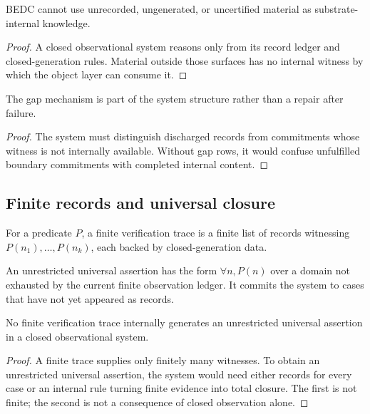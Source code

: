\begin{corollary}
\label{cor:philosophy-knowledge-comes-from-records}
BEDC cannot use unrecorded, ungene\-rated, or uncertified material as
substrate-internal knowledge.
\end{corollary}
\begin{proof}
A closed observational system reasons only from its record ledger and
closed-generation rules. Material outside those surfaces has no
internal witness by which the object layer can consume it.
\end{proof}

\begin{corollary}
\label{cor:philosophy-gaps-structural}
The gap mechanism is part of the system structure rather than a repair
after failure.
\end{corollary}
\begin{proof}
The system must distinguish discharged records from commitments whose
witness is not internally available. Without gap rows, it would confuse
unfulfilled boundary commitments with completed internal content.
\end{proof}

\subsection{Finite records and universal closure}
\label{subsec:philosophy-finite-records-universal-closure}

\begin{definition}
\label{def:philosophy-finite-verification-trace}
For a predicate \(P\), a finite verification trace is a finite list of
records witnessing \(P(n_1),\ldots,P(n_k)\), each backed by
closed-generation data.
\end{definition}

\begin{definition}
\label{def:philosophy-unrestricted-universal-assertion}
An unrestricted universal assertion has the form \(\forall n, P(n)\)
over a domain not exhausted by the current finite observation ledger.
It commits the system to cases that have not yet appeared as records.
\end{definition}

\begin{theorem}
\label{thm:philosophy-finite-verification-not-universal}
No finite verification trace internally generates an unrestricted
universal assertion in a closed observational system.
\end{theorem}
\begin{proof}
A finite trace supplies only finitely many witnesses. To obtain an
unrestricted universal assertion, the system would need either records
for every case or an internal rule turning finite evidence into total
closure. The first is not finite; the second is not a consequence of
closed observation alone.
\end{proof}

